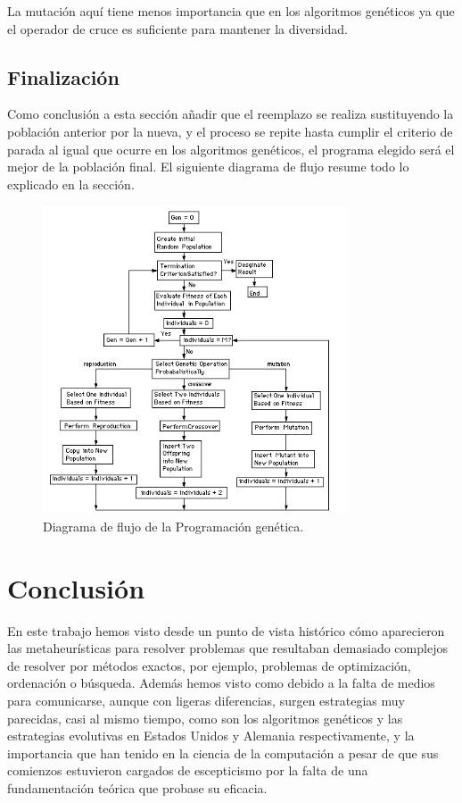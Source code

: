 \documentclass[12pt]{article} \usepackage[utf8x]{inputenc}
\begin{document}
La mutación aquí tiene menos importancia que en los algoritmos
genéticos ya que el operador de cruce es suficiente para mantener la
diversidad.

\subsection{Finalización}

Como conclusión a esta sección añadir que el reemplazo se realiza
sustituyendo la población anterior por la nueva, y el proceso se
repite hasta cumplir el criterio de parada al igual que ocurre en los
algoritmos genéticos, el programa elegido será el mejor de la
población final. El siguiente diagrama de flujo resume todo lo
explicado en la sección.

\begin{figure}[H]
  \centering
  \includegraphics[width=0.8\textwidth]{FlowchartGP.PNG}
  \caption{Diagrama de flujo de la Programación genética.}
  \label{fig:dfd:1}
\end{figure}

\section{Conclusión}

En este trabajo hemos visto desde un punto de vista histórico cómo aparecieron las
metaheurísticas para resolver problemas que resultaban demasiado complejos de resolver
por métodos exactos, por ejemplo, problemas de optimización, ordenación o búsqueda.
Además hemos visto como debido a la falta de medios para comunicarse, aunque con ligeras
diferencias, surgen estrategias muy parecidas, casi al mismo tiempo, como son los algoritmos
genéticos y las estrategias evolutivas en Estados Unidos y Alemania respectivamente, y la importancia
que han tenido en la ciencia de la computación a pesar de que sus comienzos estuvieron
cargados de escepticismo por la falta de una fundamentación teórica que probase su eficacia. \\
\end{document}
